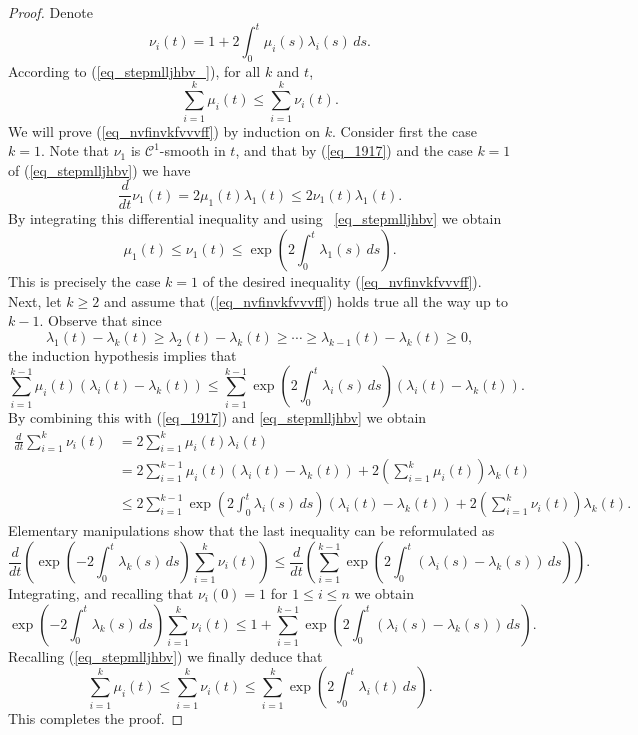 \documentclass[12pt,a4paper]{article}
\theoremstyle{definition}
\begin{document}
\begin{proof} Denote
\begin{equation}  \nu_i(t) = 1 + 2 \int_0^t \mu_i (s) \lambda_i (s) \, ds. \label{eq_1917} \end{equation}
According to (\ref{eq_stepmlljhbv_}), for all $k$ and $t$,
\begin{equation}\label{eq_stepmlljhbv}
\sum_{i=1}^k \mu_i(t)
\leq \sum_{i=1}^k \nu_i(t).
\end{equation}
We will prove (\ref{eq_nvfinvkfvvvff}) by induction on $k$. Consider first the case $k=1$.
Note that $\nu_1$ is $\mathcal C^1$-smooth in $t$, and
that by (\ref{eq_1917}) and the case $k=1$  of (\ref{eq_stepmlljhbv}) we have
\[
\frac d{dt} \nu_1 (t) = 2 \mu_1 (t) \lambda_1 (t)
\leq 2 \nu_1(t) \lambda_1 (t) .
\]
By integrating this differential inequality and
using ~\eqref{eq_stepmlljhbv} we obtain 
\[
\mu_1 (t) \leq \nu_1 (t) \leq
\exp \left( 2 \int_0^t \lambda_1 (s) \, ds \right).
\]
This is precisely the case $k=1$ of the desired inequality (\ref{eq_nvfinvkfvvvff}).
Next, let $k \geq 2$ and assume that (\ref{eq_nvfinvkfvvvff})
holds true all the way up
to $k-1$. Observe that since
\[
\lambda_1 (t) -\lambda_k (t) \geq \lambda_2(t) - \lambda_k(t) \geq \dotsb \geq \lambda_{k-1} (t) - \lambda_k (t) \geq 0 ,
\]
the induction hypothesis implies that
\[
\sum_{i=1}^{k-1} \mu_i (t) (\lambda_i (t) - \lambda_k (t) )
\leq \sum_{i=1}^{k-1} \exp \left( 2 \int_0^t \lambda_i(s) \,ds  \right)
(\lambda_i (t) - \lambda_k (t) ) .
\]
By combining this with (\ref{eq_1917}) and \eqref{eq_stepmlljhbv} we obtain
\[
\begin{split}
\frac{d}{dt} \sum_{i=1}^k \nu_i (t)
& = 2 \sum_{i=1}^k \mu_i (t) \lambda_i (t) \\
& = 2 \sum_{i=1}^{k-1} \mu_i (t) (\lambda_i (t) - \lambda_k (t) )
 + 2 \left( \sum_{i=1}^k \mu_i (t) \right) \lambda_k (t)  \\
& \leq 2 \sum_{i=1}^{k-1} \exp \left( 2 \int_0^t \lambda_i (s) \, ds \right)
 ( \lambda_i (t) - \lambda_k (t) ) + 2 \left( \sum_{i=1}^k \nu_i (t) \right) \lambda_k (t) .
\end{split}
\]
Elementary manipulations show that the last inequality can be reformulated
as
\[
\frac d{dt} \left( \exp \left( -2 \int_0^t \lambda_k (s) \, ds \right) \sum_{i=1}^k \nu_i (t) \right) \leq
\frac{d}{dt} \left( \sum_{i=1}^{k-1} \exp \left( 2 \int_0^t (\lambda_i (s) -\lambda_k (s)) \, ds \right) \right) .
\]
Integrating, and recalling that $\nu_i (0) = 1$ for  $1 \leq i\leq n$
we obtain 
\[
\exp \left( -2 \int_0^t \lambda_k (s) \, ds \right) \sum_{i=1}^k \nu_i (t)  \leq 1 +
\sum_{i=1}^{k-1} \exp \left( 2 \int_0^t (\lambda_i (s) -\lambda_k (s)) \, ds \right) .
\]
Recalling (\ref{eq_stepmlljhbv}) we finally deduce that 
\[
\sum_{i=1}^k \mu_i (t) \leq \sum_{i=1}^k \nu_i (t) \leq
\sum_{i=1}^k \exp \left( 2 \int_0^t \lambda_i (t) \, ds \right).
\]
This completes the proof.
\end{proof}
\end{document}
